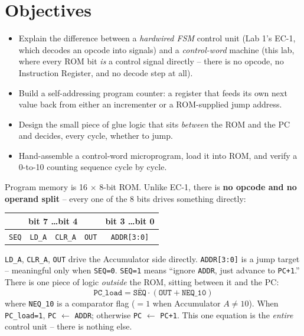 \documentclass[11pt]{article}
\begin{document}
\labheader

\section*{Objectives}
\begin{itemize}[leftmargin=*,nosep]
  \item Explain the difference between a \emph{hardwired FSM} control unit (Lab 1's
        EC-1, which decodes an opcode into signals) and a \emph{control-word}
        machine (this lab, where every ROM bit \emph{is} a control signal directly --
        there is no opcode, no Instruction Register, and no decode step at all).
  \item Build a self-addressing program counter: a register that feeds its own next
        value back from either an incrementer or a ROM-supplied jump address.
  \item Design the small piece of glue logic that sits \emph{between} the ROM and the
        PC and decides, every cycle, whether to jump.
  \item Hand-assemble a control-word microprogram, load it into ROM, and verify a
        0-to-10 counting sequence cycle by cycle.
\end{itemize}

\begin{summary}
Program memory is 16 $\times$ 8-bit ROM. Unlike EC-1, there is \textbf{no opcode and
no operand split} -- every one of the 8 bits drives something directly:
\begin{center}
\begin{tabular}{@{}cccccccc@{}}
\toprule
\multicolumn{4}{c}{bit 7 \quad\ldots\quad bit 4} & \multicolumn{4}{c}{bit 3 \quad\ldots\quad bit 0} \\
\midrule
\texttt{SEQ} & \texttt{LD\_A} & \texttt{CLR\_A} & \texttt{OUT} & \multicolumn{4}{c}{\texttt{ADDR[3:0]}} \\
\bottomrule
\end{tabular}
\end{center}
\texttt{LD\_A}, \texttt{CLR\_A}, \texttt{OUT} drive the Accumulator side directly.
\texttt{ADDR[3:0]} is a jump target -- meaningful only when \texttt{SEQ=0}.
\texttt{SEQ=1} means ``ignore \texttt{ADDR}, just advance to \texttt{PC+1}.''
There is one piece of logic \emph{outside} the ROM, sitting between it and the PC:
\[
\texttt{PC\_load} = \overline{\texttt{SEQ}} \cdot (\texttt{OUT} + \texttt{NEQ\_10})
\]
where \texttt{NEQ\_10} is a comparator flag ($=1$ when Accumulator $A \neq 10$).
When \texttt{PC\_load=1}, \texttt{PC} $\leftarrow$ \texttt{ADDR}; otherwise
\texttt{PC} $\leftarrow$ \texttt{PC+1}. This one equation is the \emph{entire}
control unit -- there is nothing else.
\end{summary}
\end{document}

